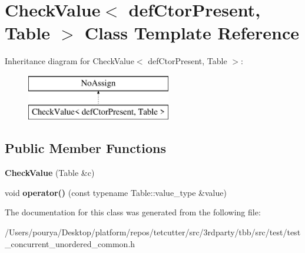 \hypertarget{classCheckValue}{}\section{Check\+Value$<$ def\+Ctor\+Present, Table $>$ Class Template Reference}
\label{classCheckValue}
Inheritance diagram for Check\+Value$<$ def\+Ctor\+Present, Table $>$\+:\begin{figure}[H]
\begin{center}
\leavevmode
\includegraphics[height=2.000000cm]{classCheckValue}
\end{center}
\end{figure}
\subsection*{Public Member Functions}
\begin{DoxyCompactItemize}
\item 
\hypertarget{classCheckValue_a7d9694e48614282974ea11eaf2c32976}{}{\bfseries Check\+Value} (Table \&c)\label{classCheckValue_a7d9694e48614282974ea11eaf2c32976}

\item 
\hypertarget{classCheckValue_a564ef0a9182639b39bd4ad09a8c2026a}{}void {\bfseries operator()} (const typename Table\+::value\+\_\+type \&value)\label{classCheckValue_a564ef0a9182639b39bd4ad09a8c2026a}

\end{DoxyCompactItemize}


The documentation for this class was generated from the following file\+:\begin{DoxyCompactItemize}
\item 
/\+Users/pourya/\+Desktop/platform/repos/tetcutter/src/3rdparty/tbb/src/test/test\+\_\+concurrent\+\_\+unordered\+\_\+common.\+h\end{DoxyCompactItemize}

